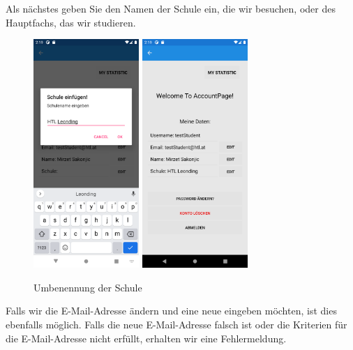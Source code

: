 \newpage
Als nächstes geben Sie den Namen der Schule ein, die wir besuchen, oder des Hauptfachs, das wir studieren.
\begin{figure}[h]
    \begin{center}
    \includegraphics[width=4cm]{pics/Xamarin Student/17 School.png}\hfill
    \includegraphics[width=4cm]{pics/Xamarin Student/18 School success.png}
    \caption[MyAccount]{Umbenennung der Schule}
    \end{center}
\end{figure}
\newpage
Falls wir die E-Mail-Adresse ändern und eine neue eingeben möchten, ist dies ebenfalls möglich. Falls die neue E-Mail-Adresse falsch ist oder die Kriterien für die E-Mail-Adresse nicht erfüllt, erhalten wir eine Fehlermeldung.
